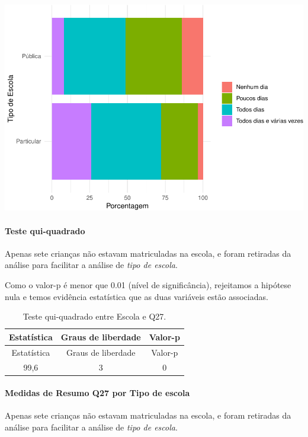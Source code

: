 \documentclass[]{article}
\let\oldparagraph\paragraph
\renewcommand{\paragraph}[1]{\oldparagraph{#1}\mbox{}}
\begin{document}
\begin{center}\includegraphics[width=0.75\linewidth]{relatorio_covid19_files/figure-latex/unnamed-chunk-820-1} \end{center}

\hypertarget{teste-qui-quadrado-71}{%
\paragraph{Teste qui-quadrado}\label{teste-qui-quadrado-71}}

Apenas sete crianças não estavam matriculadas na escola, e foram retiradas da análise para facilitar a análise de \emph{tipo de escola}.

Como o valor-p é menor que 0.01 (nível de significância), rejeitamos a hipótese nula e temos evidência estatística que as duas variáveis estão associadas.

\begin{longtable}[]{@{}ccc@{}}
\caption{\label{tab:unnamed-chunk-822}Teste qui-quadrado entre Escola e Q27.}\tabularnewline
\toprule
Estatística & Graus de liberdade & Valor-p\tabularnewline
\midrule
\endfirsthead
\toprule
Estatística & Graus de liberdade & Valor-p\tabularnewline
\midrule
\endhead
99,6 & 3 & 0\tabularnewline
\bottomrule
\end{longtable}

\cleardoublepage

\hypertarget{medidas-de-resumo-q27-por-tipo-de-escola}{%
\paragraph{Medidas de Resumo Q27 por Tipo de escola}\label{medidas-de-resumo-q27-por-tipo-de-escola}}

Apenas sete crianças não estavam matriculadas na escola, e foram retiradas da análise para facilitar a análise de \emph{tipo de escola}.
\end{document}
